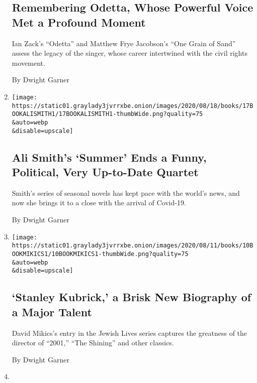\begin{enumerate}
{  \subsection{Remembering Odetta, Whose Powerful Voice Met a Profound
  Moment}\label{remembering-odetta-whose-powerful-voice-met-a-profound-moment}}

  Ian Zack's ``Odetta'' and Matthew Frye Jacobson's ``One Grain of
  Sand'' assess the legacy of the singer, whose career intertwined with
  the civil rights movement.

  By Dwight Garner
\item
  \href{/2020/08/17/books/review-summer-ali-smith.html}{}

  \texttt{[image: https://static01.graylady3jvrrxbe.onion/images/2020/08/18/books/17BOOKALISMITH1/17BOOKALISMITH1-thumbWide.png?quality=75\\\&auto=webp\\\&disable=upscale]}

  \hypertarget{ali-smiths-summer-ends-a-funny-political-very-up-to-date-quartet}{%
  \subsection{Ali Smith's `Summer' Ends a Funny, Political, Very
  Up-to-Date
  Quartet}\label{ali-smiths-summer-ends-a-funny-political-very-up-to-date-quartet}}

  Smith's series of seasonal novels has kept pace with the world's news,
  and now she brings it to a close with the arrival of Covid-19.

  By Dwight Garner
\item
  \href{/2020/08/10/books/review-stanley-kubrick-biography-david-mikics.html}{}

  \texttt{[image: https://static01.graylady3jvrrxbe.onion/images/2020/08/11/books/10BOOKMIKICS1/10BOOKMIKICS1-thumbWide.png?quality=75\\\&auto=webp\\\&disable=upscale]}

  \hypertarget{stanley-kubrick-a-brisk-new-biography-of-a-major-talent}{%
  \subsection{`Stanley Kubrick,' a Brisk New Biography of a Major
  Talent}\label{stanley-kubrick-a-brisk-new-biography-of-a-major-talent}}

  David Mikics's entry in the Jewish Lives series captures the greatness
  of the director of ``2001,'' ``The Shining'' and other classics.

  By Dwight Garner
\item
  \href{/2020/07/31/books/review-caste-isabel-wilkerson-origins-of-our-discontents.html}{}


\end{enumerate}
